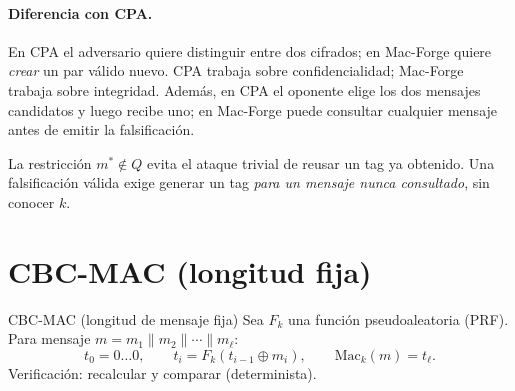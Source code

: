 \documentclass[11pt,a4paper]{article}
\begin{document}
\paragraph{Diferencia con CPA.}  En CPA el adversario quiere distinguir entre dos
cifrados; en Mac-Forge quiere \emph{crear} un par v\'alido nuevo.  CPA trabaja sobre
confidencialidad; Mac-Forge trabaja sobre integridad.  Adem\'as, en CPA el oponente
elige los dos mensajes candidatos y luego recibe uno; en Mac-Forge puede consultar
cualquier mensaje antes de emitir la falsificaci\'on.

\begin{ojo}
La restricci\'on $m^* \notin Q$ evita el ataque trivial de reusar un tag ya
obtenido.  Una falsificaci\'on v\'alida exige generar un tag \emph{para un mensaje
nunca consultado}, sin conocer $k$.
\end{ojo}

\section{CBC-MAC (longitud fija)}

\begin{definicion}{CBC-MAC (longitud de mensaje fija)}
Sea $F_k$ una funci\'on pseudoaleatoria (PRF).  Para mensaje $m=m_1\|m_2\|\cdots\|m_\ell$:
\[
  t_0 = 0\ldots0, \qquad
  t_i = F_k(t_{i-1} \oplus m_i), \qquad
  \mathrm{Mac}_k(m) = t_\ell.
\]
Verificaci\'on: recalcular y comparar (determinista).
\end{definicion}
\end{document}
